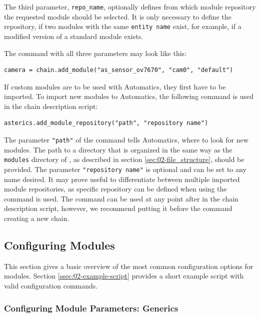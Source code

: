The third parameter, \texttt{repo\_name}, optionally defines from which module repository the requested module should be selected.
It is only necessary to define the repository, if two modules with the same \texttt{entity name} exist, for example, if a modified version of a standard \asterics module exists.

The  command with all three parameters may look like this:
\begin{lstlisting}[style=AutomaticsPython]
camera = chain.add_module("as_sensor_ov7670", "cam0", "default")
\end{lstlisting}

If custom modules are to be used with Automatics, they first have to be imported.
To import new modules to Automatics, the following command is used in the chain description script:
\begin{lstlisting}[style=AutomaticsPython]
asterics.add_module_repository("path", "repository name")
\end{lstlisting}
The parameter \texttt{"path"} of the command tells Automatics, where to look for new modules.
The path to a directory that is organized in the same way as the \texttt{modules} directory of \asterics, as described in section \ref{sec:02-file_structure}, should be provided.
The parameter \texttt{"repository name"} is optional and can be set to any name desired.
It may prove useful to differentiate between multiple imported module repositories, as specific repository can be defined when using the  command is used.
The command can be used at any point after  in the chain description script, however, we recommend putting it before the command creating a new chain.

\subsection{Configuring \asterics Modules}
\label{ssec:02-configuring}

This section gives a basic overview of the most common configuration options for \asterics modules.
Section \ref{ssec:02-example-script} provides a short example script with valid configuration commands.

\subsubsection{Configuring Module Parameters: Generics}


